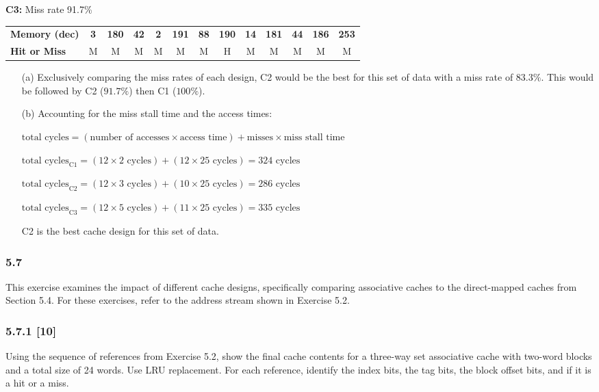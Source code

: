 \documentclass[fleqn]{article}
\begin{document}
\textbf{C3:} Miss rate 91.7\%
\vspace{-0.1in}
\begin{table}[H]
    \setlength{\tabcolsep}{6pt}
    \fontsize{9pt}{12pt}\selectfont
    \begin{tabular}{l|c|c|c|c|c|c|c|c|c|c|c|c}
    \textbf{Memory (dec)} & \textbf{3} & \textbf{180} & \textbf{42} & \textbf{2} & \textbf{191} & \textbf{88} & \textbf{190} & \textbf{14} & \textbf{181} & \textbf{44} & \textbf{186} & \textbf{253} \\ 
    \textbf{Hit or Miss} & M & M & M & M & M & M & H & M & M & M & M & M \\
    \end{tabular}
    \end{table}
\begin{itemize}
    \item[(a)] Exclusively comparing the miss rates of each design, C2 would be the best for this set of data with a miss rate of $83.3\%$. This would be followed by C2 ($91.7\%$) then C1 ($100\%$).
    \item[(b)] Accounting for the miss stall time and the access times:
    \begin{addmargin}[0.5cm]{0cm}
    $\text{total cycles} = (\text{number of accesses} \times \text{access time}) + \text{misses} \times \text{miss stall time}$

    $\text{total cycles}_{\text{C1}} = (12 \times 2 \text{ cycles}) + (12 \times 25 \text{ cycles}) = 324 \text{ cycles}$

    $\text{total cycles}_{\text{C2}} = (12 \times 3 \text{ cycles}) + (10 \times 25 \text{ cycles}) = 286 \text{ cycles}$

    $\text{total cycles}_{\text{C3}} = (12 \times 5 \text{ cycles}) + (11 \times 25 \text{ cycles}) = 335 \text{ cycles}$
    \end{addmargin}
    C2 is the best cache design for this set of data.
\end{itemize}

\subsubsection*{5.7} This exercise examines the impact of different cache designs, specifically comparing associative caches to the direct-mapped caches from Section 5.4. For these exercises, refer to the address stream shown in Exercise 5.2.

\subsubsection*{5.7.1 [10] \textrangle} Using the sequence of references from Exercise 5.2, show the final cache contents for a three-way set associative cache with two-word blocks and a total size of 24 words. Use LRU replacement. For each reference, identify the index bits, the tag bits, the block offset bits, and if it is a hit or a miss.
\end{document}
